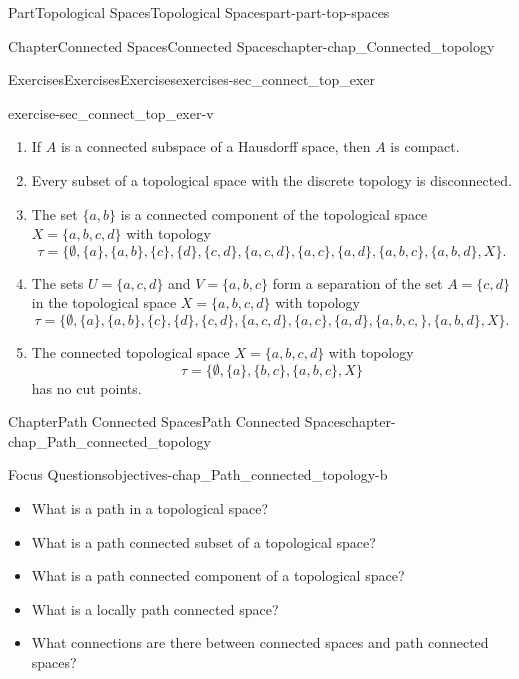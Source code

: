 \documentclass[oneside,10pt,]{book}
\numberwithin{equation}{chapter}
\begin{document}
\begin{partptx}{Part}{Topological Spaces}{}{Topological Spaces}{}{}{part-part-top-spaces}
\begin{chapterptx}{Chapter}{Connected Spaces}{}{Connected Spaces}{}{}{chapter-chap_Connected_topology}
\begin{exercises-section}{Exercises}{Exercises}{}{Exercises}{}{}{exercises-sec_connect_top_exer}
\begin{divisionexercise}{22}{}{}{exercise-sec_connect_top_exer-v}
\begin{enumerate}[font=\bfseries,label=(\alph*),ref=\alph*]
\item{}If \(A\) is a connected subspace of a Hausdorff space, then \(A\) is compact.%
\item{}Every subset of a topological space with the discrete topology is disconnected.%
\item{}The set \(\{a,b\}\) is a connected component of the topological space \(X = \{a,b,c,d\}\) with topology%
\begin{equation*}
\tau = \{\emptyset, \{a\}, \{a,b\}, \{c\}, \{d\}, \{c,d\}, \{a,c,d\}, \{a,c\}, \{a,d\}, \{a,b,c\}, \{a,b,d\}, X\}\text{.}
\end{equation*}
%
\item{}The sets \(U = \{a,c,d\}\) and \(V = \{a,b,c\}\) form a separation of the set \(A = \{c,d\}\) in the topological space \(X = \{a,b,c,d\}\) with topology%
\begin{equation*}
\tau = \{\emptyset, \{a\}, \{a,b\}, \{c\}, \{d\}, \{c,d\}, \{a,c,d\}, \{a,c\}, \{a,d\}, \{a,b,c,\}, \{a,b,d\}, X\}\text{.}
\end{equation*}
%
\item{}The connected topological space \(X = \{a,b,c,d\}\) with topology%
\begin{equation*}
\tau = \{\emptyset, \{a\}, \{b,c\}, \{a,b,c\}, X\}
\end{equation*}
has no cut points.%
\end{enumerate}%
\end{divisionexercise}%
\end{exercises-section}
\end{chapterptx}
%
\typeout{************************************************}
\typeout{************************************************}
%
\begin{chapterptx}{Chapter}{Path Connected Spaces}{}{Path Connected Spaces}{}{}{chapter-chap_Path_connected_topology}
\renewcommand*{\chaptername}{Chapter}
\begin{objectives}{Focus Questions}{objectives-chap_Path_connected_topology-b}
%
\begin{itemize}[label=\textbullet]
\item{}What is a path in a topological space?%
\item{}What is a path connected subset of a topological space?%
\item{}What is a path connected component of a topological space?%
\item{}What is a locally path connected space?%
\item{}What connections are there between connected spaces and path connected spaces?%

\end{itemize}
\end{objectives}
\end{chapterptx}
\end{partptx}
\end{document}
